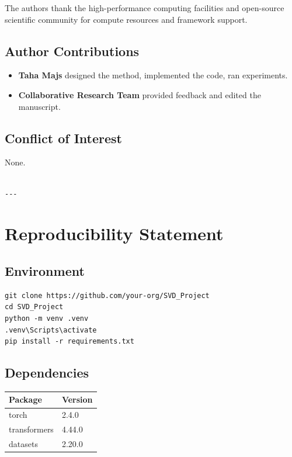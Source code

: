 The authors thank the high-performance computing facilities and open-source scientific community for compute resources and framework support.

\subsection{Author Contributions}

\begin{itemize}
\item \textbf{Taha Majs} designed the method, implemented the code, ran experiments.
\item \textbf{Collaborative Research Team} provided feedback and edited the manuscript.

\end{itemize}
\subsection{Conflict of Interest}

None.
\begin{lstlisting}

---
\end{lstlisting}

\section{Reproducibility Statement}

\subsection{Environment}

\begin{lstlisting}
git clone https://github.com/your-org/SVD_Project
cd SVD_Project
python -m venv .venv
.venv\Scripts\activate
pip install -r requirements.txt
\end{lstlisting}

\subsection{Dependencies}

\begin{table}[H]
\centering
\small
\begin{tabular}{ll}
\toprule
\textbf{Package} & \textbf{Version} \\
\midrule
torch & 2.4.0 \\
transformers & 4.44.0 \\
datasets & 2.20.0 \\
\bottomrule
\end{tabular}
\end{table}

